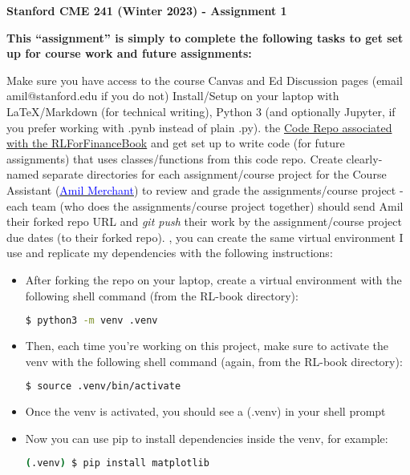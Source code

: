 \documentclass[12pt]{exam}
\begin{document}
\begin{center}
{\large {\bf Stanford CME 241 (Winter 2023) - Assignment 1}}
\end{center}
 
{\large{\bf This ``assignment'' is simply to complete the following tasks to get set up for course work and future assignments:}}
\begin{questions}
\question Make sure you have access to the course Canvas and Ed Discussion pages (email amil@stanford.edu if you do not)
\question Install/Setup on your laptop with LaTeX/Markdown (for technical writing), Python 3 (and optionally Jupyter, if you prefer working with .pynb instead of plain .py).
 the \href{https://github.com/TikhonJelvis/RL-book}{Code Repo associated with the RLForFinanceBook} and get set up to write code (for future assignments) that uses classes/functions from this code repo.
\question Create clearly-named separate directories for each assignment/course project for the Course Assistant (\href{mailto:amil@stanford.edu}{\underline{\textcolor{blue}{Amil Merchant}}}) to review and grade the assignments/course project - each team (who does the assignments/course project together) should send Amil their forked repo URL and {\em git push} their work by the assignment/course project due dates (to their forked repo).
, you can create the same virtual environment I use and replicate my dependencies with the following instructions:
\begin{itemize}
\item After forking the repo on your laptop, create a virtual environment with the following shell command (from the RL-book directory):
\begin{lstlisting}[language=bash]
$ python3 -m venv .venv
\end{lstlisting}
\item Then, each time you're working on this project, make sure to activate the venv with the following shell command (again, from the RL-book directory):
\begin{lstlisting}[language=bash]
$ source .venv/bin/activate
\end{lstlisting}
\item Once the venv is activated, you should see a (.venv) in your shell prompt
\item Now you can use pip to install dependencies inside the venv, for example:
\begin{lstlisting}[language=bash]
(.venv) $ pip install matplotlib
\end{lstlisting}

\end{itemize}
\end{questions}
\end{document}
